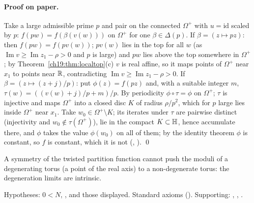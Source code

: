 \paragraph{Proof on paper.}  Take a large admissible prime $p$ and pair on the connected $\Omega^+$ with $u=\mathrm{id}$ scaled by $p$:
$f(pw)=f(\beta(v(w)))$ on $\Omega^+$ for one $\beta\in\Delta(p)$.  If $\beta=(z\mapsto pz)$: then $f(pw)=f(pv(w))$; $pv(w)$ lies in the top for all $w$
(as $\operatorname{Im}v\ge\operatorname{Im}z_1-\rho>0$ and $p$ is large) and $pw$ lies above the top somewhere in $\Omega^+$; by
Theorem~\ref{ch19:thm:localtop}(c) $v$ is real affine, so it maps points of $\Omega^+$ near $x_1$ to points near $\mathbb{R}$, contradicting
$\operatorname{Im}v\ge\operatorname{Im}z_1-\rho>0$.  If $\beta=(z\mapsto(z+j)/p)$: put $\phi(z)=f(pz)$ and, with a suitable integer $m$,
$\tau(w)=((v(w)+j)/p+m)/p$.  By periodicity $\phi\circ\tau=\phi$ on $\Omega^+$; $\tau$ is injective and maps $\Omega^+$ into a closed disc $K$ of radius
$\rho/p^2$, which for $p$ large lies inside $\Omega^+$ near $x_1$.  Take $w_0\in\Omega^+\setminus K$; its iterates under $\tau$ are pairwise distinct
(injectivity and $w_0\notin\tau(\Omega^+)$), lie in the compact $K\subset\mathbb{H}$, hence accumulate there, and $\phi$ takes the value $\phi(w_0)$
on all of them; by the identity theorem $\phi$ is constant, so $f$ is constant, which it is not
(, ). \qed
\begin{physics}A symmetry of the twisted partition function cannot push the moduli of a degenerating torus (a point of the real
axis) to a non-degenerate torus: the degeneration limits are intrinsic.\end{physics}
\begin{status}Hypotheses: $0<N$, , and those displayed.  Standard axioms
().  Supporting: , ,
.\end{status}

